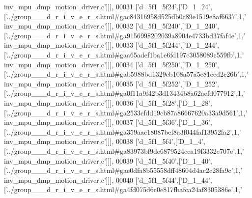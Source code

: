\begin{DoxyCode}
{      inv\_mpu\_dmp\_motion\_driver.c'}]]],
00031   [\textcolor{stringliteral}{'d\_5f1\_5f24'},[\textcolor{stringliteral}{'D\_1\_24'},[\textcolor{stringliteral}{'../group\_\_\_d\_r\_i\_v\_e\_r\_s.html#gac84316958d525db0c89e1519e8af6637'},1,\textcolor{stringliteral}{'
      inv\_mpu\_dmp\_motion\_driver.c'}]]],
00032   [\textcolor{stringliteral}{'d\_5f1\_5f240'},[\textcolor{stringliteral}{'D\_1\_240'},[\textcolor{stringliteral}{'../group\_\_\_d\_r\_i\_v\_e\_r\_s.html#ga9156998202039a8904e4733bd37faf4e'},1,\textcolor{stringliteral}{'
      inv\_mpu\_dmp\_motion\_driver.c'}]]],
00033   [\textcolor{stringliteral}{'d\_5f1\_5f244'},[\textcolor{stringliteral}{'D\_1\_244'},[\textcolor{stringliteral}{'../group\_\_\_d\_r\_i\_v\_e\_r\_s.html#gaa65adef1ba1e6fd197e3058089c559fb'},1,\textcolor{stringliteral}{'
      inv\_mpu\_dmp\_motion\_driver.c'}]]],
00034   [\textcolor{stringliteral}{'d\_5f1\_5f250'},[\textcolor{stringliteral}{'D\_1\_250'},[\textcolor{stringliteral}{'../group\_\_\_d\_r\_i\_v\_e\_r\_s.html#gab5988bd1329cb108a57a5e81ecd2c26b'},1,\textcolor{stringliteral}{'
      inv\_mpu\_dmp\_motion\_driver.c'}]]],
00035   [\textcolor{stringliteral}{'d\_5f1\_5f252'},[\textcolor{stringliteral}{'D\_1\_252'},[\textcolor{stringliteral}{'../group\_\_\_d\_r\_i\_v\_e\_r\_s.html#ga0f11a9f42b3d13434b8a62aefd077912'},1,\textcolor{stringliteral}{'
      inv\_mpu\_dmp\_motion\_driver.c'}]]],
00036   [\textcolor{stringliteral}{'d\_5f1\_5f28'},[\textcolor{stringliteral}{'D\_1\_28'},[\textcolor{stringliteral}{'../group\_\_\_d\_r\_i\_v\_e\_r\_s.html#ga2533cfdd19cb87a86667620a33a9d561'},1,\textcolor{stringliteral}{'
      inv\_mpu\_dmp\_motion\_driver.c'}]]],
00037   [\textcolor{stringliteral}{'d\_5f1\_5f36'},[\textcolor{stringliteral}{'D\_1\_36'},[\textcolor{stringliteral}{'../group\_\_\_d\_r\_i\_v\_e\_r\_s.html#ga359aac18087bef8a3f044faf13952fa2'},1,\textcolor{stringliteral}{'
      inv\_mpu\_dmp\_motion\_driver.c'}]]],
00038   [\textcolor{stringliteral}{'d\_5f1\_5f4'},[\textcolor{stringliteral}{'D\_1\_4'},[\textcolor{stringliteral}{'../group\_\_\_d\_r\_i\_v\_e\_r\_s.html#ga83973bf9de6879524cca19f3332e707e'},1,\textcolor{stringliteral}{'
      inv\_mpu\_dmp\_motion\_driver.c'}]]],
00039   [\textcolor{stringliteral}{'d\_5f1\_5f40'},[\textcolor{stringliteral}{'D\_1\_40'},[\textcolor{stringliteral}{'../group\_\_\_d\_r\_i\_v\_e\_r\_s.html#gae0dfa8b55558dff48604d4ac2c28fa9c'},1,\textcolor{stringliteral}{'
      inv\_mpu\_dmp\_motion\_driver.c'}]]],
00040   [\textcolor{stringliteral}{'d\_5f1\_5f44'},[\textcolor{stringliteral}{'D\_1\_44'},[\textcolor{stringliteral}{'../group\_\_\_d\_r\_i\_v\_e\_r\_s.html#ga4fd075d6c0e817fbafca24af8305386e'},1,\textcolor{stringliteral}{'
}
\end{DoxyCode}
